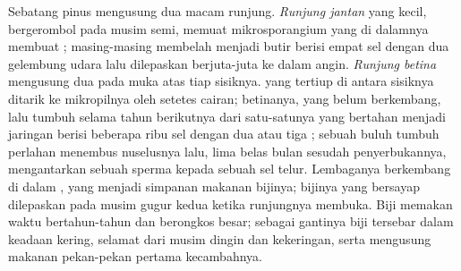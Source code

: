 \begin{proposition}\label{prop:b2:plant-life-cycles:conifer}
Sebatang pinus mengusung dua macam runjung. \emph{Runjung jantan} yang
kecil, bergerombol pada musim semi, memuat mikrosporangium yang di
dalamnya  membuat ; masing-masing membelah menjadi
butir  berisi empat sel dengan dua gelembung udara lalu
dilepaskan berjuta-juta ke dalam angin. \emph{Runjung betina} mengusung
dua  pada muka atas tiap sisiknya.  yang tertiup
di antara sisiknya ditarik ke mikropilnya oleh setetes cairan;
 betinanya, yang belum berkembang, lalu tumbuh selama tahun
berikutnya dari satu-satunya  yang bertahan menjadi jaringan
berisi beberapa ribu sel dengan dua atau tiga ; sebuah buluh
 tumbuh perlahan menembus nuselusnya lalu, lima belas bulan
sesudah penyerbukannya, mengantarkan sebuah sperma kepada sebuah sel
telur. Lembaganya berkembang di dalam , yang menjadi
simpanan makanan bijinya; bijinya yang bersayap dilepaskan pada musim
gugur kedua ketika runjungnya membuka. Biji memakan waktu bertahun-tahun
dan berongkos besar; sebagai gantinya biji tersebar dalam keadaan
kering, selamat dari musim dingin dan kekeringan, serta mengusung
makanan pekan-pekan pertama kecambahnya.
\end{proposition}

